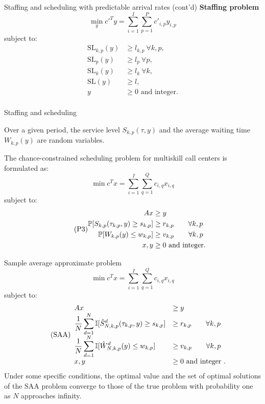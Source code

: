 \documentclass[aspectratio=169]{beamer}
\begin{document}
\begin{frame}{Staffing and scheduling with predictable arrival rates (cont'd)}
	\textbf{Staffing problem}	
	\[
	\min_y {c'}^T y = \sum_{i=1}^I\sum_{p=1}^P c'_{i,p}y_{i,p}
	\]
	subject to:
	\begin{equation} \tag{P2}
		\begin{aligned}
			\text{SL}_{k,p}({y}) &\geq l_{k,p} ~\forall k,p, \\
			\text{SL}_{p}({y}) &\geq l_{p} ~\forall p, \\
			\text{SL}_{k}({y}) &\geq l_{k} ~\forall k, \\
			\text{SL}(y) &\geq l,\\
			{y}&\geq 0 \text{ and integer}  \text{.}\\
		\end{aligned}
	\end{equation}
\end{frame}

\begin{frame}{Staffing and scheduling}
	
	Over a given period, the service level $S_{k,p}(\tau, y)$ and the average waiting time $W_{k,p}(y)$ are random variables.
	
	The chance-constrained scheduling problem for multiskill call centers is formulated as:
	\[
	\min {c}^T{x} = \sum_{i=1}^I \sum_{q=1}^Q c_{i,q}x_{i,q}
	\]
	subject to:
	\begin{equation} \tag{P3}
		\begin{aligned}
			{Ax} &\geq {y} \\
			\mathbb{P}[S_{k,p}(\tau_{k,p}, {y}) \geq s_{k,p}] &\geq r_{k,p} \text{\qquad{}}  \forall k,p \\
			\mathbb{P}[W_{k,p}(y) \leq w_{k,p}] &\geq  v_{k,p} \text{\qquad{}} \forall k,p\\
			{x}, {y} &\geq 0 \text{ and integer}. \\
		\end{aligned}
	\end{equation}
\end{frame}


\begin{frame}{Sample average approximate problem}
	\[
	\min {c}^T{x} = \sum_{i=1}^I \sum_{q=1}^Q c_{i,q}x_{i,q}
	\]
	subject to:
	\begin{equation} \tag{SAA} \label{s1}
		\begin{array}{ll}
			{Ax} &\geq {y} \\
			\displaystyle \frac{1}{N} \sum_{d=1}^N\mathbb{I}[\hat{S}_{N, k,p}^d(\tau_{k,p}, {y}) \geq s_{k,p}] &\geq r_{k,p} \text{\qquad{}}\forall k,p\\
			\displaystyle \frac{1}{N}\sum_{d=1}^N\mathbb{I}[\hat{W}_{N,k,p}^d({y}) \leq w_{k,p}]&\geq v_{k,p} \text{\qquad{}}\forall k,p\\
			{x}, {y} &\geq 0 \text{ and integer}  \text{ .}\\
		\end{array}
	\end{equation}
	Under some specific conditions, the optimal value and the set of optimal solutions of the SAA problem converge to those of the true problem  with probability one as $N$ approaches infinity. 
\end{frame}
\end{document}
